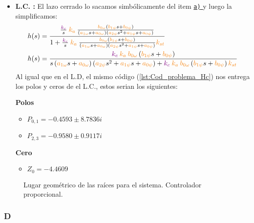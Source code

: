 \begin{itemize}
    \item \textbf{L.C. :} El lazo cerrado lo sacamos simbólicamente del item \hyperref[pregunta-a]{\texttt{a)} } y luego la simplificamos:
    \begin{align*}
        &h(s) = \dfrac{  \frac{\mora{k_c}}{s} \nara{k_a} \frac{\nara{\nara{b_{0\omega}}}\left(\nara{b_{1\psi}}s + \nara{b_{0\psi}}\right)}
        {\left(\nara{a_{1\omega}}s + \nara{a_{0\omega}}\right)\left(\nara{a_{2\psi}}s^{2} + \nara{a_{1\psi}}s + \nara{a_{0\psi}}\right)}   }{  1+  \frac{\mora{k_c}}{s} \nara{k_a} \frac{\nara{\nara{b_{0\omega}}}\left(\nara{b_{1\psi}}s + \nara{b_{0\psi}}\right)}
        {\left(\nara{a_{1\omega}}s + \nara{a_{0\omega}}\right)\left(\nara{a_{2\psi}}s^{2} + \nara{a_{1\psi}}s + \nara{a_{0\psi}}\right)}\nara{k_{st}}  } \\
        &h(s) = \dfrac{     \mora{k_c} \nara{k_a}    \nara{\nara{b_{0\omega}}}\left(\nara{b_{1\psi}}s + \nara{b_{0\psi}}\right)    }{    s \left(\nara{a_{1\omega}}s + \nara{a_{0\omega}}\right)\left(\nara{a_{2\psi}}s^{2} + \nara{a_{1\psi}}s + \nara{a_{0\psi}}\right)    + \mora{k_c} \nara{k_a}     \nara{\nara{b_{0\omega}}}\left(\nara{b_{1\psi}}s + \nara{b_{0\psi}}\right)   
       \nara{k_{st}}   }
    \end{align*}
    Al igual que en el L.D, el mismo código (\autoref{lst:Cod_problema_Hc}) nos entrega los polos y ceros de el L.C., estos serian los siguientes:
    \begin{multicols}{2}
        \textbf{Polos}
        \begin{itemize}
            \item \(P_{0,1} = -0.4593 \pm 8.7836i\) 
            \item \(P_{2,3} = -0.9580 \pm 0.9117i\) 
        \end{itemize}
        \columnbreak
        \textbf{Cero}
        \begin{itemize}
            \item \(Z_0 = -4.4609\)
        \end{itemize}
      \end{multicols}
\end{itemize}


\begin{figure}[ht]
  \centering
  
  \caption{Lugar geométrico de las raíces para el sistema. Controlador proporcional.}
  \label{fig:lgr-h}
\end{figure}

\FloatBarrier
\subsubsection{D}%

